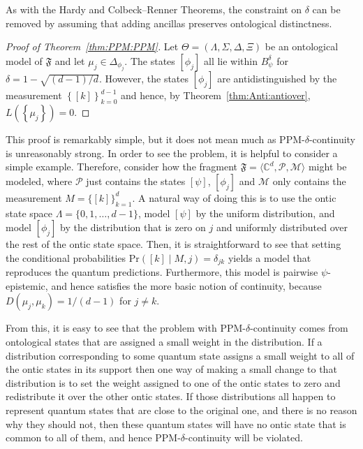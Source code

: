 \documentclass[DIV=calc,paper=a4,fontsize=11pt,twocolumn]{scrartcl} %
\theoremstyle{definition}
\theoremstyle{plain}
\newcommand{\Proj}[1]{\ensuremath{\left [ #1 \right ]}}
\begin{document}
As with the Hardy and Colbeck--Renner Theorems, the constraint on
$\delta$ can be removed by assuming that adding ancillas preserves
ontological distinctness.

\begin{proof}[Proof of Theorem~\ref{thm:PPM:PPM}]
Let $\Theta = (\Lambda, \Sigma, \Delta, \Xi)$ be an ontological model
of $\mathfrak{F}$ and let $\mu_j \in \Delta_{\phi_j}$.  The states
$\Proj{\phi_j}$ all lie within $B^{\delta}_{\psi}$ for $\delta = 1 -
\sqrt{(d-1)/d}$.  However, the states $\Proj{\phi_j}$ are
antidistinguished by the measurement $\left \{ \Proj{k} \right
\}_{k=0}^{d-1}$ and hence, by Theorem~\ref{thm:Anti:antiover}, $L
\left ( \left \{ \mu_j \right \} \right ) = 0$.
\end{proof}

This proof is remarkably simple, but it does not mean much as
PPM-$\delta$-continuity is unreasonably strong.  In order to see the
problem, it is helpful to consider a simple example.  Therefore,
consider how the fragment $\mathfrak{F} = \langle \mathbb{C}^d,
\mathcal{P}, \mathcal{M} \rangle$ might be modeled, where
$\mathcal{P}$ just contains the states $\Proj{\psi}$, $\Proj{\phi_j}$
and $\mathcal{M}$ only contains the measurement $M =
\{\Proj{k}\}_{k=1}^d$.  A natural way of doing this is to use the
ontic state space $\Lambda = \{0,1,\ldots,d-1\}$, model $\Proj{\psi}$
by the uniform distribution, and model $\Proj{\phi_j}$ by the
distribution that is zero on $j$ and uniformly distributed over the
rest of the ontic state space.  Then, it is straightforward to see
that setting the conditional probabilities $\text{Pr} \left (\Proj{k}
\middle | M, j \right ) = \delta_{jk}$ yields a model that
reproduces the quantum predictions.  Furthermore, this model is
pairwise $\psi$-epistemic, and hence satisfies the more basic notion
of continuity, because $D(\mu_j,\mu_k) = 1/(d-1)$ for $j \neq k$.

From this, it is easy to see that the problem with
PPM-$\delta$-continuity comes from ontological states that are
assigned a small weight in the distribution.  If a distribution
corresponding to some quantum state assigns a small weight to all of
the ontic states in its support then one way of making a small change
to that distribution is to set the weight assigned to one of the ontic
states to zero and redistribute it over the other ontic states.  If
those distributions all happen to represent quantum states that are
close to the original one, and there is no reason why they should not,
then these quantum states will have no ontic state that is common to
all of them, and hence PPM-$\delta$-continuity will be violated.
\end{document}

